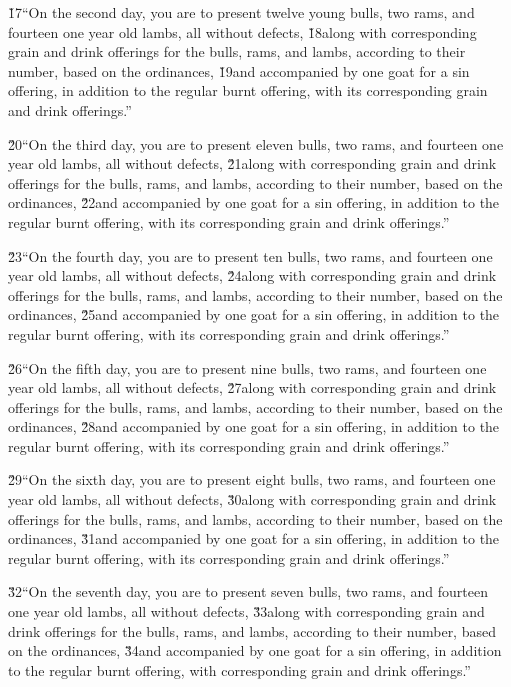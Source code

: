 \v{17}``On the second day, you are to present twelve young bulls, two rams, and fourteen one year old lambs, all without defects, \v{18}along with corresponding grain and drink offerings for the bulls, rams, and lambs, according to their number, based on the ordinances, \v{19}and accompanied by one goat for a sin offering, in addition to the regular burnt offering, with its corresponding grain and drink offerings.''

\v{20}``On the third day, you are to present eleven bulls, two rams, and fourteen one year old lambs, all without defects, \v{21}along with corresponding grain and drink offerings for the bulls, rams, and lambs, according to their number, based on the ordinances, \v{22}and accompanied by one goat for a sin offering, in addition to the regular burnt offering, with its corresponding grain and drink offerings.''

\v{23}``On the fourth day, you are to present ten bulls, two rams, and fourteen one year old lambs, all without defects, \v{24}along with corresponding grain and drink offerings for the bulls, rams, and lambs, according to their number, based on the ordinances, \v{25}and accompanied by one goat for a sin offering, in addition to the regular burnt offering, with its corresponding grain and drink offerings.''

\v{26}``On the fifth day, you are to present nine bulls, two rams, and fourteen one year old lambs, all without defects, \v{27}along with corresponding grain and drink offerings for the bulls, rams, and lambs, according to their number, based on the ordinances, \v{28}and accompanied by one goat for a sin offering, in addition to the regular burnt offering, with its corresponding grain and drink offerings.''

\v{29}``On the sixth day, you are to present eight bulls, two rams, and fourteen one year old lambs, all without defects, \v{30}along with corresponding grain and drink offerings for the bulls, rams, and lambs, according to their number, based on the ordinances, \v{31}and accompanied by one goat for a sin offering, in addition to the regular burnt offering, with its corresponding grain and drink offerings.''

\v{32}``On the seventh day, you are to present seven bulls, two rams, and fourteen one year old lambs, all without defects, \v{33}along with corresponding grain and drink offerings for the bulls, rams, and lambs, according to their number, based on the ordinances, \v{34}and accompanied by one goat for a sin offering, in addition to the regular burnt offering, with corresponding grain and drink offerings.''

